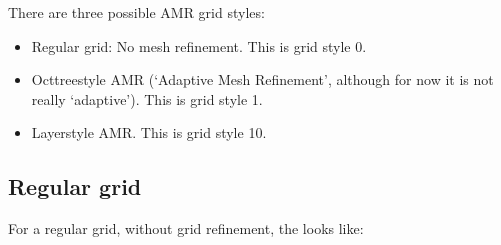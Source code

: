 \documentclass[letterpaper,10pt,english]{sphinxmanual}
\begin{document}
There are three possible AMR grid styles:
\begin{itemize}
\item {} 
Regular grid: No mesh refinement. This is grid style 0.

\item {} 
Oct\sphinxhyphen{}tree\sphinxhyphen{}style AMR (‘Adaptive Mesh Refinement’, although for now it
is not really ‘adaptive’). This is grid style 1.

\item {} 
Layer\sphinxhyphen{}style AMR. This is grid style 10.

\end{itemize}


\subsection{Regular grid}
\label{\detokenize{inputoutputfiles:regular-grid}}\label{\detokenize{inputoutputfiles:sec-amr-grid-regular}}
For a regular grid, without grid refinement, the  looks like:

\begin{sphinxVerbatim}[commandchars=\\\{\}]
                                      
                                             
              
                      
\PYG{p}{[}\PYG{p}{]}        \PYG{p}{[}\PYG{p}{]}        \PYG{p}{[}\PYG{p}{]}         \PYG{p}{[}\PYG{p}{]}
\PYG{p}{[}\PYG{p}{]}        \PYG{p}{[}\PYG{p}{]}        \PYG{p}{[}\PYG{p}{]}         \PYG{p}{[}\PYG{p}{]}
\PYG{p}{[}\PYG{p}{]}        \PYG{p}{[}\PYG{p}{]}        \PYG{p}{[}\PYG{p}{]}         \PYG{p}{[}\PYG{p}{]}
\end{sphinxVerbatim}
\end{document}
